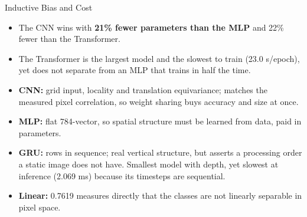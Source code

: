 \begin{frame}{Inductive Bias and Cost}
\small
\begin{itemize}
    \item The CNN wins with \textbf{21\% fewer parameters than the MLP} and 22\% fewer than the Transformer.
    \item The Transformer is the largest model and the slowest to train (23.0 s/epoch), yet does not
          separate from an MLP that trains in half the time.
    \item \textbf{CNN:} grid input, locality and translation equivariance; matches the measured pixel
          correlation, so weight sharing buys accuracy and size at once.
    \item \textbf{MLP:} flat 784-vector, so spatial structure must be learned from data, paid in parameters.
    \item \textbf{GRU:} rows in sequence; real vertical structure, but asserts a processing order a static
          image does not have. Smallest model with depth, yet slowest at inference (2.069 ms) because
          its timesteps are sequential.
    \item \textbf{Linear:} 0.7619 measures directly that the classes are not linearly separable in pixel space.
\end{itemize}
\end{frame}


